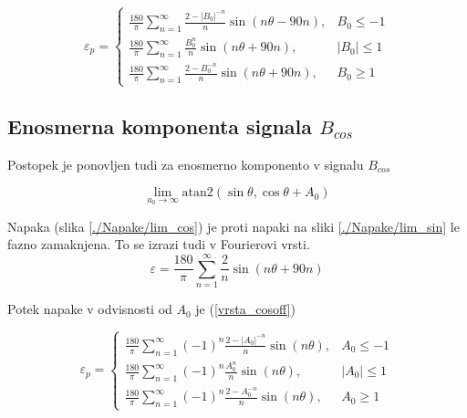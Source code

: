 \begin{equation}
\label{vrsta_sinoff}
\varepsilon_p=
\begin{cases}
\frac{180}{\pi}\sum_{n=1}^{\infty}\frac{2-|B_0|^{-n}}{n} \sin (n \theta -  90 n), & B_0\leq -1 \\
\frac{180}{\pi}\sum_{n=1}^{\infty}\frac{B_0^n}{n} \sin (n \theta + 90 n), & |B_0|\leq 1 \\
\frac{180}{\pi}\sum_{n=1}^{\infty}\frac{2-B_0^{-n}}{n} \sin (n \theta + 90 n), & B_0\geq 1
\end{cases}
\end{equation}


\subsection{Enosmerna komponenta signala $B_{cos}$}

Postopek je ponovljen tudi za enosmerno komponento v signalu $B_{cos}$


\begin{equation}
\lim_{a_0 \rightarrow \infty} \mathrm{atan2}(\sin{\theta},\cos{\theta} + A_0)
\end{equation}

Napaka (slika \ref{./Napake/lim_cos}) je proti napaki na  sliki \ref{./Napake/lim_sin} le fazno zamaknjena.
To se izrazi tudi v Fourierovi vrsti.
\begin{equation}
\varepsilon = \frac{180}{\pi}\sum_{n=1}^{\infty}\frac{2}{n} \sin (n \theta+ 90 n)
\end{equation}

Potek napake v odvisnosti od $A_0$ je (\ref{vrsta_cosoff})

\begin{equation}
\label{vrsta_cosoff}
\varepsilon_p=
\begin{cases}
\frac{180}{\pi}\sum_{n=1}^{\infty}(-1)^n\frac{2-|A_0|^{-n}}{n} \sin (n \theta ), & A_0\leq -1 \\
\frac{180}{\pi}\sum_{n=1}^{\infty}(-1)^n\frac{A_0^n}{n} \sin (n \theta ), & |A_0|\leq 1 \\
\frac{180}{\pi}\sum_{n=1}^{\infty}(-1)^n\frac{2-A_0^{-n}}{n} \sin (n \theta ), & A_0\geq 1
\end{cases}
\end{equation}

